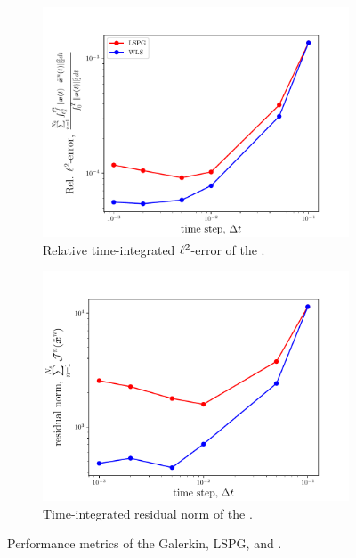 \begin{figure}
\begin{center}
\begin{subfigure}[t]{0.45\textwidth}
\includegraphics[width=1.\linewidth]{figs/sod/error_vs_window_dtvar.pdf}
\caption{Relative time-integrated $\ell^2$-error of the \methodAcronymROM.}
\label{fig:sod_time_step_a}
\end{subfigure}
\begin{subfigure}[t]{0.45\textwidth}
\includegraphics[width=1.\linewidth]{figs/sod/objective_vs_window_dtvar.pdf}
\caption{Time-integrated residual norm of the \methodAcronymROM.} 
\label{fig:sod_time_step_b}
\end{subfigure}
\caption{Performance metrics of the Galerkin, LSPG, and \methodAcronymROMs.} 
\label{fig:time_step_study}
\end{center}
\end{figure}

